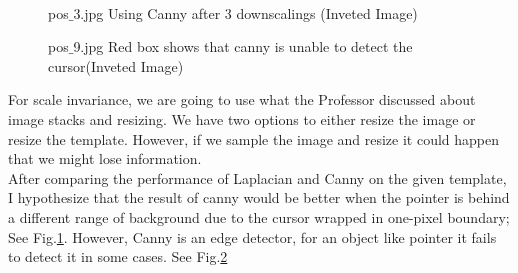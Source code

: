 \documentclass[12pt]{article}
\newenvironment{QandA}
{
	\begin{enumerate}[label=\normalfont\arabic*.,leftmargin=2em,rightmargin=2em]\normalfont
	}
	{
	\end{enumerate}
}
\newenvironment{answered}{\setlength{\parindent}{1em}\par\normalfont}{}
\begin{document}
\begin{QandA}
\begin{answered}
\\
\begin{figure}
		\centering
  			\caption{pos$\_$3.jpg Using Canny after 3 downscalings (Inveted Image)}
  		\label{wow-canny-wow}
\end{figure}
\begin{figure}
		\centering
  			\caption{pos$\_$9.jpg Red box shows that canny is unable to detect the cursor(Inveted Image)}
  		\label{canny-problem}
\end{figure}
For scale invariance, we are going to use what the Professor discussed about image stacks and resizing. We have two options to either resize the image or resize the template. However, if we sample the image and resize it could happen that we might lose information.
\\
After comparing the performance of Laplacian and Canny on the given template, I hypothesize that the result of canny would be better when the pointer is behind a different range of background due to the cursor wrapped in one-pixel boundary; See Fig.{\ref{wow-canny-wow}}. However, Canny is an edge detector, for an object like pointer it fails to detect it in some cases. See Fig.{\ref{canny-problem}}

\end{answered}
\end{QandA}
\end{document}
